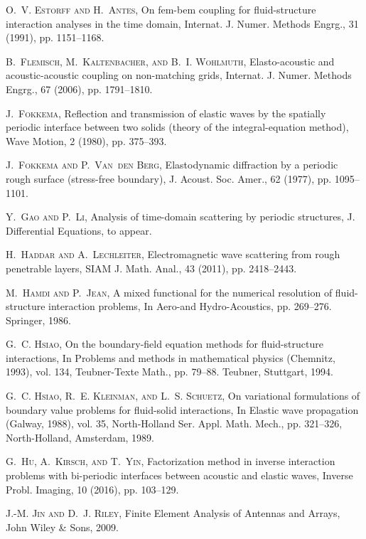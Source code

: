 \documentclass[final,leqno]{siamltex}
\begin{document}
\begin{thebibliography}{10}
\textsc{O.~V. Estorff and H.~Antes}, On fem-bem coupling for fluid-structure
interaction analyses in the time domain, Internat. J. Numer. Methods
Engrg., 31 (1991), pp. 1151--1168.

\textsc{B.~Flemisch, M.~Kaltenbacher, and B.~I. Wohlmuth}, Elasto-acoustic and
acoustic-acoustic coupling on non-matching grids, Internat. J. Numer. Methods
Engrg., 67 (2006), pp. 1791--1810.

\textsc{J.~Fokkema}, Reflection and transmission of elastic waves by the
spatially periodic interface between two solids (theory of the
integral-equation method), Wave Motion, 2 (1980), pp. 375--393.

\textsc{J.~Fokkema and P.~Van~den Berg}, Elastodynamic diffraction by a periodic
rough surface (stress-free boundary), J. Acoust. Soc. Amer., 62
(1977), pp. 1095--1101.

\textsc{Y.~Gao and P.~Li}, Analysis of time-domain scattering by periodic
structures, J. Differential Equations, to appear.

\textsc{H.~Haddar and A.~Lechleiter}, Electromagnetic wave scattering from rough
penetrable layers, SIAM J. Math. Anal., 43 (2011), pp. 2418--2443.

\textsc{M.~Hamdi and P.~Jean}, A mixed functional for the numerical resolution
of fluid-structure interaction problems, In Aero-and Hydro-Acoustics, pp.
269--276. Springer, 1986.

\textsc{G.~C. Hsiao}, On the boundary-field equation methods for fluid-structure
interactions, In Problems and methods in mathematical physics (Chemnitz, 1993),
vol. 134, Teubner-Texte Math., pp. 79--88. Teubner, Stuttgart, 1994.

\textsc{G.~C. Hsiao, R.~E. Kleinman, and L.~S. Schuetz}, On variational
formulations of boundary value problems for fluid-solid interactions, In Elastic
wave propagation (Galway, 1988), vol. 35, North-Holland Ser. Appl. Math. Mech.,
pp. 321--326, North-Holland, Amsterdam, 1989.

\textsc{G.~Hu, A.~Kirsch, and T.~Yin}, Factorization method in inverse
interaction problems with bi-periodic interfaces between acoustic and elastic
waves, Inverse Probl. Imaging,  10 (2016), pp. 103--129.

\textsc{J.-M. Jin and D.~J. Riley}, Finite Element Analysis of Antennas and
Arrays, John Wiley \& Sons, 2009.


\end{thebibliography}
\end{document}
